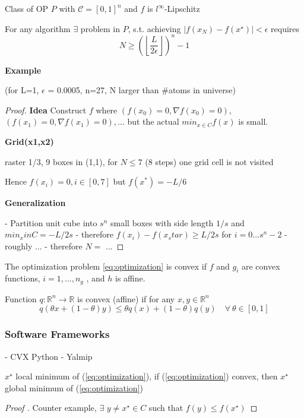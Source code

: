 Class of OP $P$ with $\mathcal{C}=[0,1]^n$
and $f$ is $l^\infty$-Lipschitz

\begin{proposition}
	For any algorithm $\exists$ problem in $P$,
	s.t. achieving $|f(x_N )−f(x^⋆)| < \epsilon$
	requires
	$$N \ge \left(\left\lfloor\frac{L}{2\epsilon}\right\rfloor\right)^n-1$$
\end{proposition}

\textbf{Example}

(for L=1, $\epsilon$ = 0.0005, n=27, N larger than \#atoms in universe)

\begin{proof}[Proof]
	\textbf{Idea}
	Construct $f$ where $(f(x_0) = 0,\nabla f(x_0) = 0)$, $(f(x_1) = 0,\nabla f(x_1) = 0),...$ but the actual $min_{x \in C}f(x)$ is small.

	\textbf{Grid(x1,x2)}

	raster 1/3, 9 boxes in (1,1), for $N\le 7$ (8 steps) one grid cell is not visited

	Hence $f(x_i) = 0, i \in [0,7]$ but $f(x^*) = -L/6$

	\textbf{Generalization}

	- Partition unit cube into $s^n$ small boxes with side length $1/s$ and $min_xinC = -L/2s$
	- therefore $f(x_i)-f(x_star) \ge L/2s$ for $i=0...s^n-2$
	- roughly ...
	- therefore $N=$ ...

\end{proof}

\begin{definition}[]
	The optimization problem \ref{eq:optimization} is convex
	if $f$ and $g_i$ are convex functions,
	$i = 1, . . . , n_g$ ,
	and $h$ is affine.
\end{definition}

\begin{definition}[]
	Function $q: \mathbb{R}^{n}\rightarrow\mathbb{R}$
	is convex (affine)
	if for any $x, y \in \mathbb{R}^{n}$
	$$
		q(\theta x+(1 − \theta)y) \le \theta q(x) + (1 − \theta)q(y)\quad\forall\ \theta \in [0, 1]
	$$
\end{definition}

\subsubsection{Software Frameworks}

- CVX Python
- Yalmip

\begin{proposition}
	$x^\star$ local minimum of (\ref{eq:optimization}),
	if (\ref{eq:optimization}) convex,
	then $x^\star$ global minimum of (\ref{eq:optimization})
\end{proposition}


\begin{proof}[Proof ]
	Counter example, $\exists$ $y\ne x^\star \in C$ such that $f(y)\le f(x^\star)$
\end{proof}
